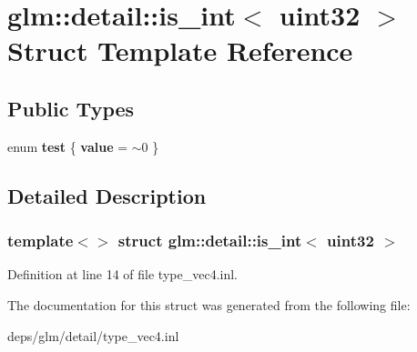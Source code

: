 \hypertarget{structglm_1_1detail_1_1is__int_3_01uint32_01_4}{}\section{glm\+:\+:detail\+:\+:is\+\_\+int$<$ uint32 $>$ Struct Template Reference}
\label{structglm_1_1detail_1_1is__int_3_01uint32_01_4}
\subsection*{Public Types}
\begin{DoxyCompactItemize}
\item 
\mbox{\label{structglm_1_1detail_1_1is__int_3_01uint32_01_4_a8930e3fe143b2eb718be340178475095}} 
enum {\bfseries test} \{ {\bfseries value} = $\sim$0
 \}
\end{DoxyCompactItemize}


\subsection{Detailed Description}
\subsubsection*{template$<$$>$\newline
struct glm\+::detail\+::is\+\_\+int$<$ uint32 $>$}



Definition at line 14 of file type\+\_\+vec4.\+inl.



The documentation for this struct was generated from the following file\+:\begin{DoxyCompactItemize}
\item 
deps/glm/detail/type\+\_\+vec4.\+inl\end{DoxyCompactItemize}
